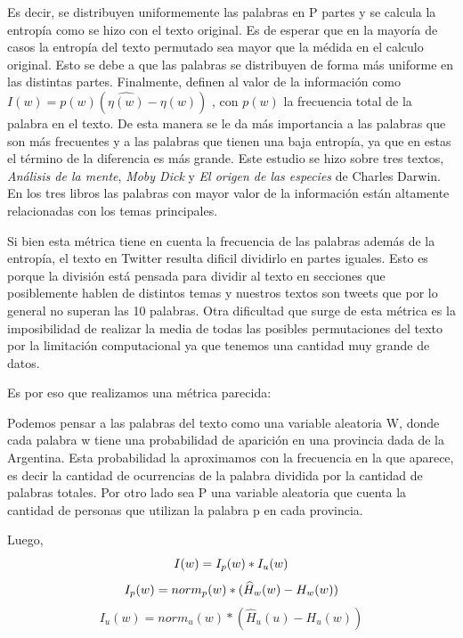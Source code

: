 Es decir, se distribuyen uniformemente las palabras en P partes y se calcula la
entropía como se hizo con el texto original. Es de esperar que en la mayoría de casos 
la entropía del texto permutado sea mayor que la médida en el calculo original. Esto 
se debe a que las palabras se distribuyen de forma más uniforme 
en las distintas partes.
Finalmente, definen al valor de la información como $I(w) = p(w) (\widehat{\eta(w)} - \eta(w))$ , con $p(w)$ la frecuencia total de la palabra en el texto. 
De esta manera se le da más importancia a las palabras que son más frecuentes y a las palabras que tienen una baja entropía, ya que en estas el término de la diferencia es más grande.
Este estudio se hizo sobre tres textos, \textit{Análisis de la mente}, 
\textit{Moby Dick} y \textit{El origen de las especies} de Charles Darwin. 
En los tres libros las palabras con mayor valor de la información están 
altamente relacionadas con los temas principales.

Si bien esta métrica tiene en cuenta la frecuencia de las palabras además de la 
entropía, el texto en Twitter resulta dificil dividirlo en partes iguales. 
Esto es porque la división está pensada para dividir al texto en secciones que 
posiblemente hablen de distintos temas y nuestros textos son tweets que por lo general no superan las 10 palabras.
Otra dificultad que surge de esta métrica es la imposibilidad de realizar la media 
de todas las posibles permutaciones del texto por la limitación computacional ya que 
tenemos una cantidad muy grande de datos.

Es por eso que realizamos una métrica parecida:

Podemos pensar a las palabras del texto como una variable aleatoria W, donde cada palabra w tiene una probabilidad de aparición en una provincia dada de la Argentina. Esta probabilidad la aproximamos con la frecuencia en la que aparece, es decir la cantidad de ocurrencias de la palabra dividida por la cantidad de palabras totales.
Por otro lado sea P una variable aleatoria que cuenta la cantidad de personas que 
utilizan la palabra p en cada provincia.

Luego,
\begin{equation}
I(w) =  I_p(w) * I_u(w)\\
\end{equation}
\begin{equation}
I_p(w) = norm_{p}(w) * (\widehat{H}_{w}(w) - H_{w}(w)) \\
\end{equation}
\begin{equation}
I_u(w) = norm_{u}(w) * (\widehat{H}_{u}(u) - H_{u}(w))
\end{equation}


